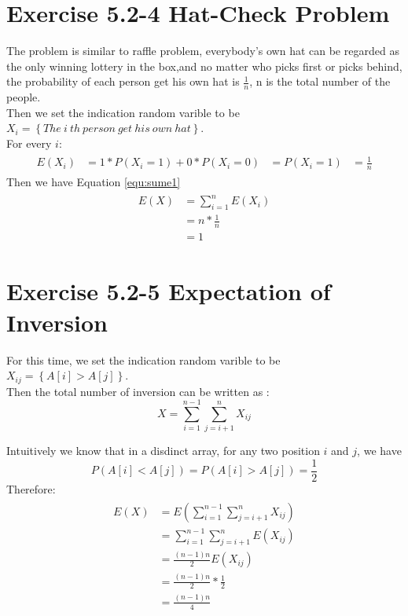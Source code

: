\documentclass[oneside]{homework} %
\begin{document}
\maketitle
\newpage
\section {Exercise 5.2-4 Hat-Check Problem}
The problem is similar to raffle problem, everybody's own hat can be regarded as the only winning lottery in the box,and no matter who picks first or picks behind, the probability of each person get his own hat is $\frac{1}{n}$, n is the total number of the people. \\


\noindent Then we set the indication random varible to be $X_{i} = \left\{The~i~th~person~get~his~own~hat\right\}$.\\
For every $i$: 
\begin{eqnarray}
  \begin{split}
	E(X_{i}) &= 1*P(X_{i}=1) + 0*P(X_{i}=0)
	 &= P(X_{i}=1)
	 &= \frac{1}{n}
  \end{split}
\end{eqnarray}
Then we have Equation \ref{equ:sume1}
\begin{eqnarray}
  \begin{split}
  E(X) &= \sum_{i=1}^{n}E(X_{i}) \\
  &= n*\frac{1}{n} \\
  &= 1
  \end{split}
  \label{equ:sume1}
\end{eqnarray}
\section {Exercise 5.2-5 Expectation of Inversion}

For this time, we set the indication random varible to be $X_{ij} = \left\{A[i]>A[j]\right\}$.\\
Then the total number of inversion can be written as :
\begin{equation}
  X = \sum_{i=1}^{n-1}\sum_{j=i+1}^{n}X_{ij}
  \label{equ:xinversion}
\end{equation}

Intuitively we know that in a disdinct array, for any two position $i$ and $j$, we have
\begin{equation}
  P(A[i]<A[j])=P(A[i]>A[j])=\frac{1}{2}
\end{equation}
Therefore: \\
\begin{eqnarray}
  \begin{split}
E(X) &= E(\sum_{i=1}^{n-1}\sum_{j=i+1}^{n}X_{ij}) \\
 &= \sum_{i=1}^{n-1}\sum_{j=i+1}^{n}E(X_{ij}) \\
 &= \frac{(n-1)n}{2}E(X_{ij}) \\
 &= \frac{(n-1)n}{2}*\frac{1}{2} \\
 &= \frac{(n-1)n}{4} \\
  \end{split}
  \label{equ:sume2}
\end{eqnarray}
\end{document}
